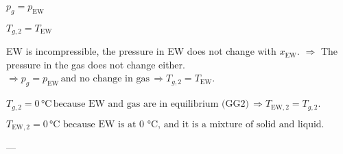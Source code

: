 \( p_g = p_{\text{EW}} \)  

\( T_{g,2} = T_{\text{EW}} \)  

EW is incompressible, the pressure in EW does not change with \( x_{\text{EW}} \).  
\(\Rightarrow\) The pressure in the gas does not change either.  
\(\Rightarrow p_g = p_{\text{EW}} \, \text{and no change in gas} \, \Rightarrow T_{g,2} = T_{\text{EW}} \).  

\( T_{g,2} = 0 \, \text{°C} \, \text{because EW and gas are in equilibrium (GG2)} \, \Rightarrow T_{\text{EW},2} = T_{g,2} \).  

\( T_{\text{EW},2} = 0 \, \text{°C because EW is at 0 °C, and it is a mixture of solid and liquid.} \)  

---